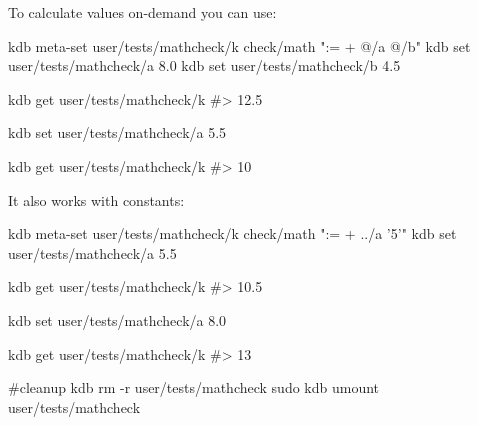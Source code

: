 To calculate values on-\/demand you can use\+:


\begin{DoxyCode}
kdb meta-set user/tests/mathcheck/k check/math ":= + @/a @/b"
kdb set user/tests/mathcheck/a 8.0
kdb set user/tests/mathcheck/b 4.5

kdb get user/tests/mathcheck/k
#> 12.5

kdb set user/tests/mathcheck/a 5.5

kdb get user/tests/mathcheck/k
#> 10
\end{DoxyCode}


It also works with constants\+:


\begin{DoxyCode}
kdb meta-set user/tests/mathcheck/k check/math ":= + ../a '5'"
kdb set user/tests/mathcheck/a 5.5

kdb get user/tests/mathcheck/k
#> 10.5

kdb set user/tests/mathcheck/a 8.0

kdb get user/tests/mathcheck/k
#> 13

#cleanup
kdb rm -r user/tests/mathcheck
sudo kdb umount user/tests/mathcheck
\end{DoxyCode}
 